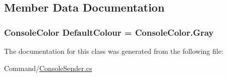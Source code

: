 \subsection{Member Data Documentation}
\hypertarget{classOTA_1_1Command_1_1ConsoleSender_a45c8186e29d86af5d38a0f35774db44a}{}
\subsubsection[{Default\+Colour}]{\setlength{\rightskip}{0pt plus 5cm}Console\+Color Default\+Colour = Console\+Color.\+Gray\hspace{0.3cm}{\ttfamily [static]}}\label{classOTA_1_1Command_1_1ConsoleSender_a45c8186e29d86af5d38a0f35774db44a}


The documentation for this class was generated from the following file\+:\begin{DoxyCompactItemize}
\item 
Command/\hyperlink{ConsoleSender_8cs}{Console\+Sender.\+cs}\end{DoxyCompactItemize}
